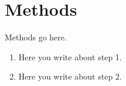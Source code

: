 \section{Methods}
Methods go here.

\begin{enumerate}
	\item Here you write about step 1.
	\item Here you write about step 2.
\end{enumerate}

